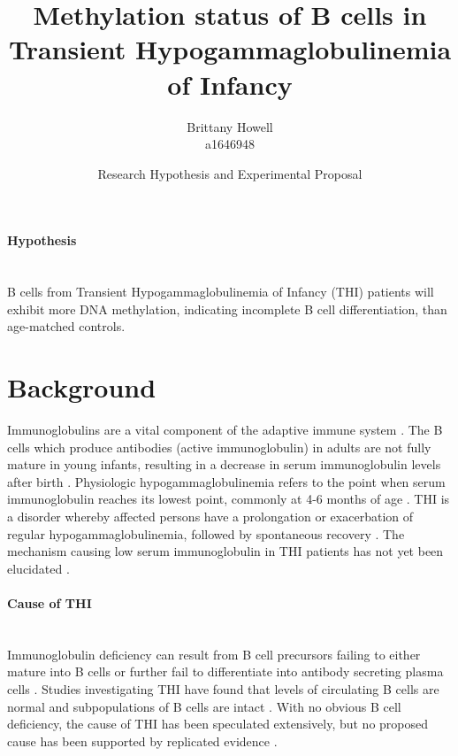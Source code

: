 \documentclass[12pt]{article}
\title{Methylation status of B cells in Transient Hypogammaglobulinemia of Infancy}
\date{Research Hypothesis and Experimental Proposal}
\author{Brittany Howell \\ a1646948}
\begin{document}
	\maketitle
	
	\paragraph{Hypothesis}
	~\\
	B cells from Transient Hypogammaglobulinemia of Infancy (THI) patients will exhibit more DNA methylation, indicating incomplete B cell differentiation, than age-matched controls.
	
	\section{Background}
	
		Immunoglobulins are a vital component of the adaptive immune system \citep{Simon15}.  
		The B cells which produce antibodies (active immunoglobulin) in adults are not fully mature in young infants, resulting in a decrease in serum immunoglobulin levels after birth \citep{Martin10,Rechavi15,Stiemh80}. 
		Physiologic hypogammaglobulinemia refers to the point when serum immunoglobulin reaches its lowest point, commonly at 4-6 months of age \citep{Dressler89}. 
		THI is a disorder whereby affected persons have a prolongation or exacerbation of regular hypogammaglobulinemia, followed by spontaneous recovery \citep{Stiemh80,Dressler89,AlHerz14,Gitlin56,AlHerz11,Rosen66,McGeady87, Dalal98,Tiller78,Buckley83}.
		The mechanism causing low serum immunoglobulin in THI patients has not yet been elucidated \citep{AlHerz14}. 

	\newpage 
	
		\paragraph{Cause of THI} 
			~\\
			Immunoglobulin deficiency can result from B cell precursors failing to either mature into B cells or further fail to differentiate into antibody secreting plasma cells \citep{Fiorilli86}. 
			Studies investigating THI have found that levels of circulating B cells are normal and subpopulations of B cells are intact \citep{Tiller78,Stiemh80,Siegel81,Buckley83,Fiorilli86,Dressler89}.
			With no obvious B cell deficiency, the cause of THI has been speculated extensively, but no proposed cause has been supported by replicated evidence \citep{Fudenberg64,Rosen66,Nathenson71,Willenbockel60,Soothill68,Tiller78,Fiorilli86,Ovadia14,Siegel81,McGeady87}.
			
\end{document}
